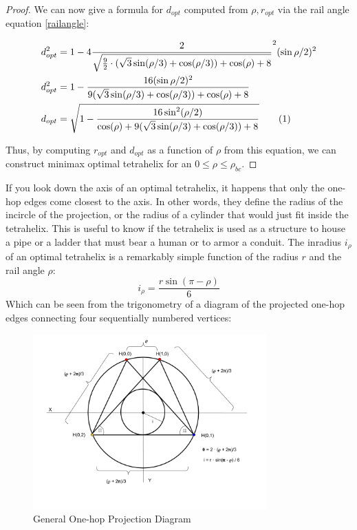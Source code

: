 \documentclass[11pt]{article}
\newcommand\numberthis{\addtocounter{equation}{1}\tag{\theequation}}
\begin{document}
\begin{proof}
We can now give a formula for $ d_{opt} $ computed from $\rho, r_{opt}$ via the rail angle equation \eqref{railangle}:

\begin{align*}
  d_{opt}^2 &= 1 - 4 \frac{2}{\sqrt{\frac{9}{2} \cdot ( \sqrt{3} \sin(\rho/3) + \cos(\rho/3)) + \cos(\rho)+ 8 }}^2 (\sin{ \rho / 2})^2   \\
  d_{opt}^2 &= 1 - \frac{16(\sin{ \rho / 2})^2}{9 ( \sqrt{3} \sin(\rho/3) + \cos(\rho/3)) + \cos(\rho)+ 8 }    \\
    d_{opt} &= \sqrt{1 - \frac{16 \sin^2(\rho / 2) }{ \cos(\rho) + 9( \sqrt{3} \sin(\rho/3) + \cos(\rho/3)) + 8 }}    \numberthis  \label{dopt}  \\      
\end{align*}

Thus, by computing $r_{opt}$  and $d_{opt}$ as a function of $\rho$ from this equation, we can construct minimax optimal tetrahelix for an $0 \leq \rho \leq \rho_{bc}$.
\end{proof}

If you look down the axis of an optimal tetrahelix, it happens that only the one-hop edges
come closest to the axis. In other words, they define the radius of the incircle of the
projection, or the radius of a cylinder that would just fit inside the tetrahelix.
This is useful to know if the tetrahelix is used as a structure to house a pipe or
a ladder that must bear a human or to armor a conduit. The inradius $i_\rho$ of
an optimal tetrahelix is a remarkably simple function of the radius $r$ and the rail angle $\rho$:
\begin{equation}
  \label{eq:inradius}
  i_{\rho} = \frac{r \sin{(\pi - \rho)}}{6}
\end{equation}
Which can be seen from the trigonometry of a diagram of the projected one-hop edges
connecting four sequentially numbered vertices:

\begin{figure}[H]
  \label{projectiondiagram}
     \centering
     \includegraphics[width=0.8\textwidth]{figures/ProjectionDiagram.png}
     \caption{General One-hop Projection Diagram}
\end{figure}
\end{document}
